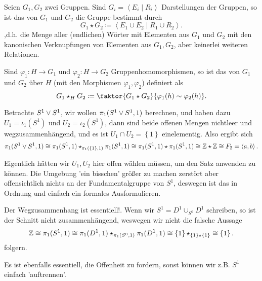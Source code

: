 \begin{ddefinition}
    Seien $G_1,G_2$ zwei Gruppen. Sind $G_i = \left< E_i \mid  R_i \right> $ Darstellungen der Gruppen, so ist das  von $G_1$ und $G_2$ die Gruppe bestimmt durch
    \[
G_1 \star G_2 \coloneqq      \left< E_1 \cup E_2\mid R_1 \cup R_2 \right> 
    .\] 
    ,d.h. die Menge aller (endlichen) Wörter mit Elementen aus $G_1$ und $G_2$ mit den kanonischen Verknupfungen von Elementen aus $G_1,G_2$, aber keinerlei weiteren Relationen.

    Sind $\varphi_1\colon H \to  G_1$ und $\varphi_2\colon H\to G_2$ Gruppenhomomorphismen, so ist das  von $G_1$ und $G_2$ über $H$ (mit den Morphismen  $\varphi_1,\varphi_2$) definiert als
\[
    G_1\star_H G_2 \coloneqq  \faktor{G_1 \star G_2}{\varphi_1(h) \sim  \varphi_2(h)}
.\] 
\end{ddefinition}

\begin{example}\label{ex:fundamentalgruppe-von-s1-wedge-s1}
    Betrachte $S^1 \vee S^1$, wir wollen $\pi_1(S^1 \vee S^1, 1)$ berechnen, und haben dazu $U_1 = ι_1(S^1)$ und $U_2 = ι_2(S^1)$, dann sind beide offenen Mengen nichtleer und wegzusammenhängend, und es ist $U_1 \cap U_2 = \left \{1\right\} $ einelementig. Also ergibt sich
    \[
        \pi_1(S^1 \vee S^1,1) \cong \pi_1(S^1,1) \star_{\pi_1(\left \{1\right\} ,1)} \pi_1(S^1,1) \cong \pi_1(S^1,1) \star \pi_1(S^1,1) \cong \mathbb{Z} \star \mathbb{Z} \cong F_2 = \left< a,b \right> 
    .\] 
    \begin{oral}
        Eigentlich hätten wir $U_1,U_2$ hier offen wählen müssen, um den Satz anwenden zu können. Die Umgebung 'ein bisschen' größer zu machen zerstört aber offensichtlich nichts an der Fundamentalgruppe von $S^1$, deswegen ist das in Ordnung und einfach ein formales Ausformulieren.
    \end{oral}
\end{example}

\begin{example}
    Der Wegzusammenhang ist essentiell!. Wenn wir $S^1 = D^1 \cup_{S^0} D^1$ schreiben, so ist der Schnitt nicht zusammenhängend, weswegen wir nicht die falsche Aussage
    \[
        \mathbb{Z} \cong \pi_1(S^1,1) \cong \pi_1(D^1,1) \star_{\pi_1(S^0,1)} \pi_1(D^1,1) \cong \left \{1\right\}  \star_{\left \{1\right\} \star \left \{1\right\} } \cong \left \{1\right\} 
    .\] 
    folgern.

    Es ist ebenfalls essentiell, die Offenheit zu fordern, sonst können wir z.B. $S^1$ einfach 'auftrennen'.
\end{example}


